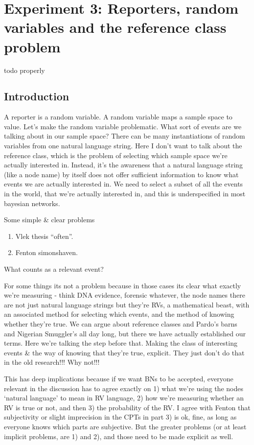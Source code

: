 
\section{Experiment 3: Reporters, random variables and the reference class problem}
{\color{red} todo properly}
\subsection{Introduction}
A reporter is a random variable. A random variable maps a sample space to value. Let's make the random variable problematic. What sort of events are we talking about in our sample space? There can be many instantiations of random variables from one natural language string. Here I don't want to talk about the reference class, which is the problem of selecting which sample space we're actually interested in. Instead, it's the awareness that a natural language string (like a node name) by itself does not offer sufficient information to know what events we are actually interested in. We need to select a subset of all the events in the world, that we're actually interested in, and this is underspecified in most bayesian networks.

Some simple \& clear problems

\begin{enumerate}
\item Vlek thesis ``often''. 
\item Fenton simonshaven.
\end{enumerate}

What counts as a relevant event?

For some things its not a problem because in those cases its clear what exactly we're measuring - think DNA evidence, forensic whatever, the node names there are not just natural language strings but they're RVs, a mathematical beast, with an associated method for selecting which events, and the method of knowing whether they're true. We can argue about reference classes and Pardo's barns and Nigerian Smuggler's all day long, but there we have actually established our terms. Here we're talking the step before that. Making the class of interesting events \& the way of knowing that they're true, explicit. They just don't do that in the old research!!! Why not!!!

This has deep implications because if we want BNs to be accepted, everyone relevant in the discussion has to agree exactly on 1) what we're using the nodes `natural language' to mean in RV language, 2) how we're measuring whether an RV is true or not, and then 3) the probability of the RV. I agree with Fenton that subjectivity or slight imprecision in the CPTs in part 3) is ok, fine, as long as everyone knows which parts are subjective. But the greater problems (or at least implicit problems, are 1) and 2), and those need to be made explicit as well.

